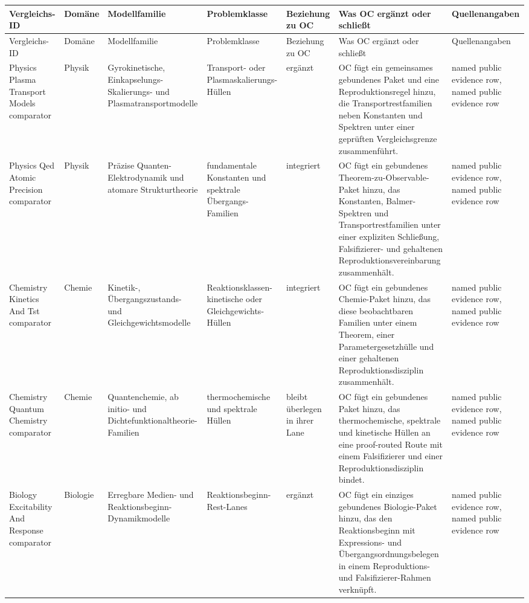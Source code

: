 \begin{longtable}{@{}L{0.14\textwidth}L{0.09\textwidth}L{0.14\textwidth}L{0.12\textwidth}L{0.10\textwidth}L{0.18\textwidth}L{0.15\textwidth}@{}}
\toprule
Vergleichs-ID & Domäne & Modellfamilie & Problemklasse & Beziehung zu OC & Was OC ergänzt oder schließt & Quellenangaben \\
\midrule
\endfirsthead
\toprule
Vergleichs-ID & Domäne & Modellfamilie & Problemklasse & Beziehung zu OC & Was OC ergänzt oder schließt & Quellenangaben \\
\midrule
\endhead
Physics Plasma Transport Models comparator & Physik & Gyrokinetische, Einkapselungs-Skalierungs- und Plasmatransportmodelle & Transport- oder Plasmaskalierungs-Hüllen & ergänzt & OC fügt ein gemeinsames gebundenes Paket und eine Reproduktionsregel hinzu, die Transportrestfamilien neben Konstanten und Spektren unter einer geprüften Vergleichsgrenze zusammenführt. & named public evidence row, named public evidence row \\
Physics Qed Atomic Precision comparator & Physik & Präzise Quanten-Elektrodynamik und atomare Strukturtheorie & fundamentale Konstanten und spektrale Übergangs-Familien & integriert & OC fügt ein gebundenes Theorem-zu-Observable-Paket hinzu, das Konstanten, Balmer-Spektren und Transportrestfamilien unter einer expliziten Schließung, Falsifizierer- und gehaltenen Reproduktionsvereinbarung zusammenhält. & named public evidence row, named public evidence row \\
Chemistry Kinetics And Tst comparator & Chemie & Kinetik-, Übergangszustands- und Gleichgewichtsmodelle & Reaktionsklassen-kinetische oder Gleichgewichts-Hüllen & integriert & OC fügt ein gebundenes Chemie-Paket hinzu, das diese beobachtbaren Familien unter einem Theorem, einer Parametergesetzhülle und einer gehaltenen Reproduktionsdisziplin zusammenhält. & named public evidence row, named public evidence row \\
Chemistry Quantum Chemistry comparator & Chemie & Quantenchemie, ab initio- und Dichtefunktionaltheorie-Familien & thermochemische und spektrale Hüllen & bleibt überlegen in ihrer Lane & OC fügt ein gebundenes Paket hinzu, das thermochemische, spektrale und kinetische Hüllen an eine proof-routed Route mit einem Falsifizierer und einer Reproduktionsdisziplin bindet. & named public evidence row, named public evidence row \\
Biology Excitability And Response comparator & Biologie & Erregbare Medien- und Reaktionsbeginn-Dynamikmodelle & Reaktionsbeginn-Rest-Lanes & ergänzt & OC fügt ein einziges gebundenes Biologie-Paket hinzu, das den Reaktionsbeginn mit Expressions- und Übergangsordnungsbelegen in einem Reproduktions- und Falsifizierer-Rahmen verknüpft. & named public evidence row, named public evidence row \\

\end{longtable}
